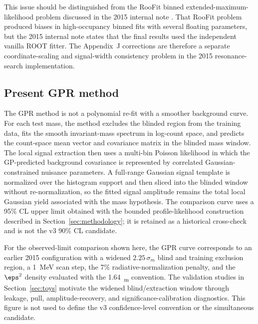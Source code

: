This issue should be distinguished from the RooFit binned extended-maximum-likelihood
problem discussed in the 2015 internal note \cite{HPS2015InternalNote}.  That RooFit
problem produced biases in high-occupancy binned fits with several floating
parameters, but the 2015 internal note states that the final results used the
independent vanilla ROOT fitter.  The Appendix~J corrections are therefore a separate
coordinate-scaling and signal-width consistency problem in the 2015 resonance-search
implementation.

\subsection{Present GPR method}

The GPR method is not a polynomial re-fit with a smoother background curve.
For each test mass, the method excludes the blinded region from the training data,
fits the smooth invariant-mass spectrum in log-count space, and predicts the
count-space mean vector and covariance matrix in the blinded mass window.  The local
signal extraction then uses a multi-bin Poisson likelihood in which the GP-predicted
background covariance is represented by correlated Gaussian-constrained nuisance
parameters.  A full-range Gaussian signal template is normalized over the histogram
support and then sliced into the blinded window without re-normalization, so the fitted
signal amplitude remains the total local Gaussian yield associated with the mass
hypothesis. The comparison curve uses a 95\% CL upper limit obtained with the bounded
profile-likelihood \CLs{} construction described in Section~\ref{sec:methodology}; it
is retained as a historical cross-check and is not the v3 90\% CL candidate.

For the observed-limit comparison shown here, the GPR curve corresponds to an earlier
2015 configuration with a widened $2.25\,\sigma_m$ blind and training
exclusion region, a \SI{1}{MeV} scan step, the 7\% radiative-normalization penalty, and
the $\eps^2$ density evaluated with the \SI{1.64}{\sigma_m} convention.  The
validation studies in Section~\ref{sec:toys} motivate the widened blind/extraction
window through leakage, pull, amplitude-recovery, and significance-calibration
diagnostics. This figure is not used to define the v3 confidence-level convention or
the simultaneous candidate.

